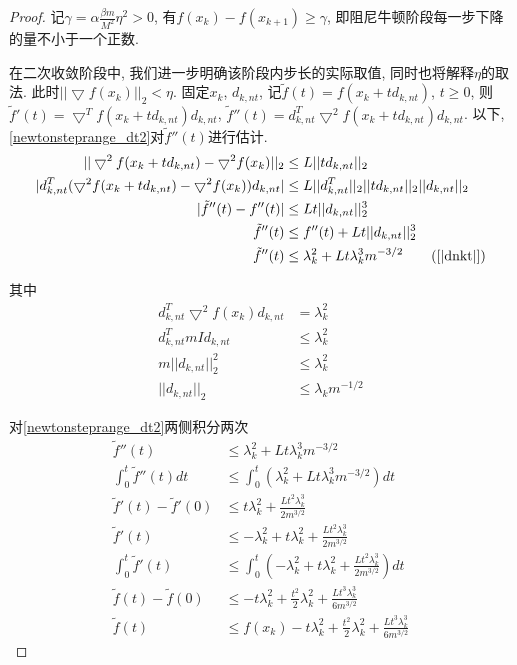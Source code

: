 \documentclass[UTF8]{ctexart}
\theoremstyle{Defination}
\theoremstyle{remark}
\begin{document}
\begin{proof}
记$\gamma=\alpha\frac{\beta m}{M^2}\eta^2>0$, 有$f(x_k)-f(x_{k+1})\geq\gamma$, 即阻尼牛顿阶段每一步下降的量不小于一个正数.

在二次收敛阶段中, 我们进一步明确该阶段内步长的实际取值, 同时也将解释$\eta$的取法. 此时$||\bigtriangledown f(x_k)||_2<\eta$. 
固定$x_k$, $d_{k,nt}$, 记$\tilde{f}(t)=f(x_k+td_{k,nt})$, $t\geq0$, 则$\tilde{f}'(t)=\bigtriangledown^Tf(x_k+td_{k,nt})d_{k,nt}$, $\tilde{f}''(t)=d_{k,nt}^T\bigtriangledown^2f(x_k+td_{k,nt})d_{k,nt}$. 以下, \autoref{newtonsteprange_dt2}对$\tilde{f}''(t)$进行估计.
\begin{equation}
\label{newtonsteprange_dt2}
\begin{aligned}
||\bigtriangledown^2f(x_k+td_{k,nt})-\bigtriangledown^2f(x_k)||_2 & \leq L||td_{k,nt}||_2 \\
|d_{k,nt}^T(\bigtriangledown^2f(x_k+td_{k,nt})-\bigtriangledown^2f(x_k))d_{k,nt}| & \leq L||d_{k,nt}^T||_2||td_{k,nt}||_2||d_{k,nt}||_2 \\
|\tilde{f}''(t)-f''(t)| & \leq Lt||d_{k,nt}||_2^3 \\
\tilde{f}''(t) & \leq f''(t)+Lt||d_{k,nt}||_2^3 \\
\tilde{f}''(t) & \leq \lambda_k^2+Lt\lambda_k^3m^{-3/2}\qquad(\autoref{|dnkt|})
\end{aligned}
\end{equation}

其中
\begin{equation}
\label{|dnkt|}
\begin{aligned}
d_{k,nt}^T\bigtriangledown^2f(x_k)d_{k,nt} & =\lambda_k^2 \\
d_{k,nt}^TmId_{k,nt} & \leq\lambda_k^2 \\
m||d_{k,nt}||_2^2 & \leq\lambda_k^2 \\
||d_{k,nt}||_2 & \leq\lambda_km^{-1/2}
\end{aligned}
\end{equation}

对\autoref{newtonsteprange_dt2}两侧积分两次
\begin{equation}
\label{newtonsteprange_dt}
\begin{aligned}
\tilde{f}''(t) & \leq \lambda_k^2+Lt\lambda_k^3m^{-3/2} \\
\int_0^t{\tilde{f}''(t)dt} & \leq \int_0^t{(\lambda_k^2+Lt\lambda_k^3m^{-3/2})dt} \\
\tilde{f}'(t)-\tilde{f}'(0) & \leq t\lambda_k^2+\frac{Lt^2\lambda_k^3}{2m^{3/2}} \\
\tilde{f}'(t) & \leq -\lambda_k^2+t\lambda_k^2+\frac{Lt^2\lambda_k^3}{2m^{3/2}} \\
\int_0^t{\tilde{f}'(t)} & \leq \int_0^t{(-\lambda_k^2+t\lambda_k^2+\frac{Lt^2\lambda_k^3}{2m^{3/2}})dt} \\
\tilde{f}(t)-\tilde{f}(0) & \leq -t\lambda_k^2+\frac{t^2}{2}\lambda_k^2+\frac{Lt^3\lambda_k^3}{6m^{3/2}} \\
\tilde{f}(t) & \leq f(x_k)-t\lambda_k^2+\frac{t^2}{2}\lambda_k^2+\frac{Lt^3\lambda_k^3}{6m^{3/2}}
\end{aligned}
\end{equation}


\end{proof}
\end{document}
